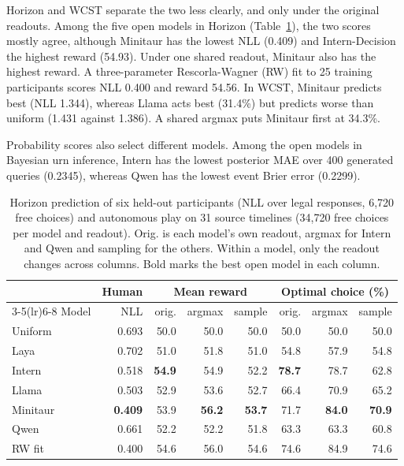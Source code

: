 \documentclass[11pt,a4paper]{article}
\begin{document}
Horizon and WCST separate the two less clearly, and only under the original readouts. Among the five open models in Horizon (Table~\ref{tab:p3-final-horizon}), the two scores mostly agree, although Minitaur has the lowest NLL (0.409) and Intern-Decision the highest reward (54.93). Under one shared readout, Minitaur also has the highest reward. A three-parameter Rescorla-Wagner (RW) fit to 25 training participants scores NLL 0.400 and reward 54.56. In WCST, Minitaur predicts best (NLL 1.344), whereas Llama acts best (31.4\%) but predicts worse than uniform (1.431 against 1.386). A shared argmax puts Minitaur first at 34.3\%.

Probability scores also select different models. Among the open models in Bayesian urn inference, Intern has the lowest posterior MAE over 400 generated queries (0.2345), whereas Qwen has the lowest event Brier error (0.2299).

\begin{table}[!b]
\centering\footnotesize
\setlength{\tabcolsep}{1.6pt}
\begin{tabular}{@{}lrrrrrrr@{}}
\toprule
 & Human & \multicolumn{3}{c}{Mean reward} & \multicolumn{3}{c}{Optimal choice (\%)} \\
\cmidrule(lr){3-5}\cmidrule(lr){6-8}
Model & NLL & orig. & argmax & sample & orig. & argmax & sample \\
\midrule
\rowcolor{tablegray} Uniform & 0.693 & 50.0 & 50.0 & 50.0 & 50.0 & 50.0 & 50.0 \\
Laya & 0.702 & 51.0 & 51.8 & 51.0 & 54.8 & 57.9 & 54.8 \\
Intern & 0.518 & \textbf{54.9} & 54.9 & 52.2 & \textbf{78.7} & 78.7 & 62.8 \\
Llama & 0.503 & 52.9 & 53.6 & 52.7 & 66.4 & 70.9 & 65.2 \\
Minitaur & \textbf{0.409} & 53.9 & \textbf{56.2} & \textbf{53.7} & 71.7 & \textbf{84.0} & \textbf{70.9} \\
Qwen & 0.661 & 52.2 & 52.2 & 51.8 & 63.3 & 63.3 & 60.8 \\
\rowcolor{tablegray} RW fit & 0.400 & 54.6 & 56.0 & 54.6 & 74.6 & 84.9 & 74.6 \\
\bottomrule
\end{tabular}
\caption{Horizon prediction of six held-out participants (NLL over legal responses, 6,720 free choices) and autonomous play on 31 source timelines (34,720 free choices per model and readout). Orig. is each model's own readout, argmax for Intern and Qwen and sampling for the others. Within a model, only the readout changes across columns. Bold marks the best open model in each column.}
\label{tab:p3-final-horizon}
\end{table}
\end{document}
